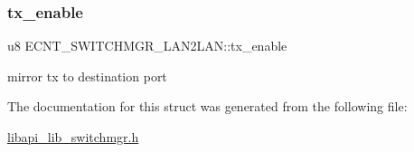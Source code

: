 \subsubsection{\texorpdfstring{tx\+\_\+enable}{tx\_enable}}
{\footnotesize\ttfamily u8 E\+C\+N\+T\+\_\+\+S\+W\+I\+T\+C\+H\+M\+G\+R\+\_\+\+L\+A\+N2\+L\+A\+N\+::tx\+\_\+enable}

mirror tx to destination port 

The documentation for this struct was generated from the following file\+:\begin{DoxyCompactItemize}
\item 
\hyperlink{libapi__lib__switchmgr_8h}{libapi\+\_\+lib\+\_\+switchmgr.\+h}\end{DoxyCompactItemize}

